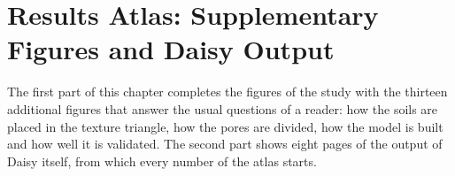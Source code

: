 \chapter{Results Atlas: Supplementary Figures and Daisy Output}\label{chap:21}
The first part of this chapter completes the figures of the study with the thirteen additional figures that answer the usual questions of a reader: how the soils are placed in the texture triangle, how the pores are divided, how the model is built and how well it is validated. The second part shows eight pages of the output of Daisy itself, from which every number of the atlas starts.
